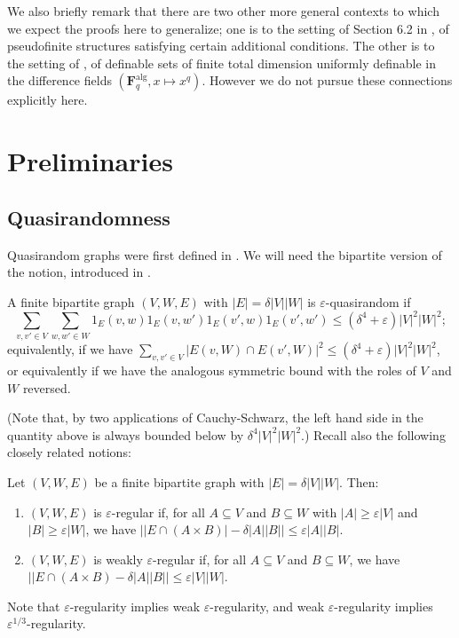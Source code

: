 \documentclass[10pt]{article}
\begin{document}
{We also briefly remark that there are two other more general contexts to which we expect the proofs here to generalize; one is to the setting of Section 6.2 in \cite{garcia_macpherson_steinhorn}, of pseudofinite structures satisfying certain additional conditions. The other is to the setting of \cite{chevalier_levi}, of definable sets of finite total dimension uniformly definable in the difference fields $(\mathbf{F}_q^{\mathrm{alg}},x\mapsto x^{q})$. However we do not pursue these connections explicitly here.


\section{Preliminaries}
\subsection {Quasirandomness}\label{qr_prelim_section}
Quasirandom graphs were first defined in \cite{chung_graham_wilson}. We will need the bipartite version of the notion, introduced in \cite{gowers_graphs}.
\begin{definition}\label{qr_defn}
    A finite bipartite graph $(V,W,E)$ with $|E|=\delta|V||W|$ is $\varepsilon$-quasirandom if $$\sum_{v,v'\in V}\sum_{w,w'\in W}1_E(v,w)1_E(v,w')1_E(v',w)1_E(v',w')\leqslant(\delta^4+\varepsilon)|V|^2|W|^2;$$ equivalently, if we have $\sum_{v,v'\in V}|E(v,W)\cap E(v',W)|^2\leqslant(\delta^4+\varepsilon)|V|^2|W|^2$, or equivalently if we have the analogous symmetric bound with the roles of $V$ and $W$ reversed.
\end{definition}(Note that, by two applications of Cauchy-Schwarz, the left hand side in the quantity above is always bounded below by $\delta^4|V|^2|W|^2$.) Recall also the following closely related notions:

\begin{definition}
    Let $(V,W,E)$ be a finite bipartite graph with $|E|=\delta|V||W|$. Then:
    \begin{enumerate}
        \item $(V,W,E)$ is $\varepsilon$-regular if, for all $A\subseteq V$ and $B\subseteq W$ with $|A|\geqslant\varepsilon|V|$ and $|B|\geqslant\varepsilon|W|$, we have $\left||E\cap (A\times B)|-\delta|A||B|\right|\leqslant\varepsilon|A||B|$.
        \item $(V,W,E)$ is weakly $\varepsilon$-regular if, for all $A\subseteq V$ and $B\subseteq W$, we have $\big||E\cap (A\times B)-\delta|A||B|\big|\leqslant\varepsilon|V||W|$.
    \end{enumerate} Note that $\varepsilon$-regularity implies weak $\varepsilon$-regularity, and weak $\varepsilon$-regularity implies $\varepsilon^{1/3}$-regularity.
\end{definition}

}
\end{document}
